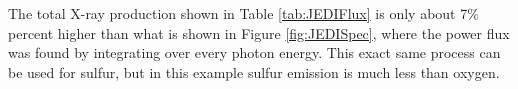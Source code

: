 The total X-ray production shown in Table \ref{tab:JEDIFlux} is only about 7$\%$ percent higher than what is shown in Figure \ref{fig:JEDISpec}, where the power flux was found by integrating over every photon energy.
This exact same process can be used for sulfur, but in this example sulfur emission is much less than oxygen.
